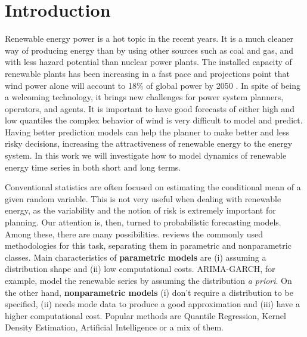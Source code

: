 \section{Introduction}


Renewable energy power is a hot topic in the recent years. It is a much cleaner way of producing energy than by using other sources such as coal and gas, and with less hazard potential than nuclear power plants. The installed capacity of renewable plants has been increasing in a fast pace and projections point that wind power alone will account to 18\% of global power by 2050  \cite{IntEnerAgency}.
In spite of being a welcoming technology, it brings new challenges for power system planners, operators, and agents. It is important to have good forecasts of either high and low quantiles
 the complex behavior of wind is very difficult to model and predict.  
Having better prediction models can help the planner to make better and less risky decisions, increasing the attractiveness of renewable energy to the energy system. 
In this work we will investigate how to model dynamics of renewable energy time series in both short and long terms.


Conventional statistics are often focused on estimating the conditional mean of a given random variable.
 This is not very useful when dealing with renewable energy, as the variability and the notion of risk is extremely important for planning. Our attention is, then, turned to probabilistic forecasting models. Among these, there are many possibilities. \cite{zhang_review_2014} reviews the commonly used methodologies for this task, separating them in parametric and nonparametric classes. Main characteristics of \textbf{parametric models} are (i) assuming a distribution shape and (ii) low computational costs. ARIMA-GARCH, for example, model the renewable series by assuming the distribution \textit{a priori}. On the other hand, \textbf{nonparametric models} (i) don't require a distribution to be specified, (ii) needs mode data to produce a good approximation and (iii) have a higher computational cost. Popular methods are Quantile Regression, Kernel Density Estimation,  Artificial Intelligence or a mix of them.


